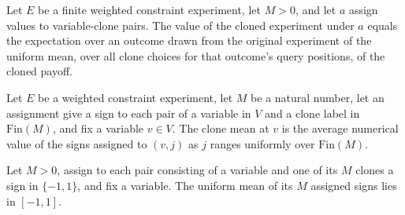 \begin{theorem}
\label{FABL.WeightedConstraintExperiment.clone_value_eq_iterated}
\leanok
{}
Let $E$ be a finite weighted constraint experiment, let $M>0$, and let $a$ assign values
to variable-clone pairs. The value of the cloned experiment under $a$ equals the
expectation over an outcome drawn from the original experiment of the uniform mean, over
all clone choices for that outcome's query positions, of the cloned payoff.
\end{theorem}

\begin{definition}
\label{FABL.WeightedConstraintExperiment.cloneMean}
\leanok
{}
Let $E$ be a weighted constraint experiment, let $M$ be a natural number, let an
assignment give a sign to each pair of a variable in $V$ and a clone label in
$\text{Fin}(M)$, and fix a variable $v\in V$. The clone mean at $v$ is the average
numerical value of the signs assigned to $(v,j)$ as $j$ ranges uniformly over
$\text{Fin}(M)$.
\end{definition}

\begin{theorem}
\label{FABL.WeightedConstraintExperiment.cloneMean_mem_Icc}
\leanok
{}
Let $M>0$, assign to each pair consisting of a variable and one of its $M$ clones a sign
in $\{ -1,1\}$, and fix a variable. The uniform mean of its $M$ assigned signs lies in
$[-1,1]$.
\end{theorem}

